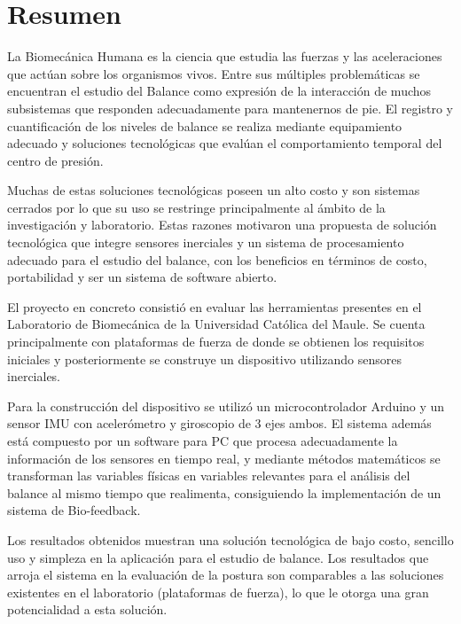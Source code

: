 \documentclass[12pt,a4paper]{article}
\begin{document}
\section*{Resumen}
La Biomecánica Humana es la ciencia que estudia las fuerzas y las aceleraciones que actúan sobre los organismos vivos. Entre sus múltiples problemáticas se encuentran el estudio del Balance como expresión de la interacción de muchos subsistemas que responden adecuadamente para mantenernos de pie. El registro y cuantificación de los niveles de balance se realiza mediante equipamiento adecuado y soluciones tecnológicas que evalúan el comportamiento temporal del centro de presión.

Muchas de estas soluciones tecnológicas poseen un alto costo y son sistemas cerrados por lo que su uso se restringe principalmente al ámbito de la investigación y laboratorio. Estas razones motivaron una propuesta de solución tecnológica que integre sensores inerciales y un sistema de procesamiento adecuado para el estudio del balance, con los beneficios en términos de costo, portabilidad y ser un sistema de software abierto.

El proyecto en concreto consistió en evaluar las herramientas presentes en el Laboratorio de Biomecánica de la Universidad Católica del Maule. Se cuenta principalmente con plataformas de fuerza de donde se obtienen los requisitos iniciales y posteriormente se construye un dispositivo utilizando sensores inerciales.

Para la construcción del dispositivo se utilizó un microcontrolador Arduino y un sensor IMU con acelerómetro y giroscopio de 3 ejes ambos. El sistema además está compuesto por un software para PC que procesa adecuadamente la información de los sensores en tiempo real, y mediante métodos matemáticos se transforman las variables físicas en variables relevantes para el análisis del balance al mismo tiempo que realimenta, consiguiendo la implementación de un sistema de Bio-feedback.

Los resultados obtenidos muestran una solución tecnológica de bajo costo, sencillo uso y simpleza en la aplicación para el estudio de balance. Los resultados que arroja el sistema en la evaluación de la postura son comparables a las soluciones existentes en el laboratorio (plataformas de fuerza), lo que le otorga una gran potencialidad a esta solución.

\newpage

\cleardoublepage
{}
\tableofcontents
\cleardoublepage
{}
\thispagestyle{empty}
\listoffigures
\thispagestyle{empty}
\newpage
\listoftables
\thispagestyle{empty}
\pagebreak
\end{document}

